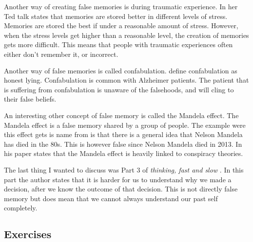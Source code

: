 \documentclass[]{article}
\begin{document}
Another way of creating false memories is during traumatic experience. In her 
Ted talk \citeauthor{Ted:1} states that memories are stored better in different
levels of stress. Memories are stored the best if under a reasonable amount of stress.
However, when the stress levels get higher than a reasonable level, the creation
of memories gets more difficult. This means that people with traumatic experiences
often either don't remember it, or incorrect.

Another way of false memories is called confabulation. \citeauthor{confabulation}
define confabulation as honest lying. Confabulation is common with Alzheimer 
patients. The patient that is suffering from confabulation is unaware of the 
falsehoods, and will cling to their false beliefs. 

An interesting other concept of false memory is called the Mandela effect. 
The Mandela effect is a false memory shared by a group of people. The 
example were this effect gets is name from is that there is a general idea 
that Nelson Mandela has died in the 80s. This is however false since Nelson Mandela
died in 2013. In his paper \citeauthor{french2019mandela} states that the Mandela
effect is heavily linked to conspiracy theories.

The last thing I wanted to discuss was Part 3 of \textit{thinking, fast and slow}
\cite{kahneman2011thinking}. In this part the author states that it is harder for 
us to understand why we made a decision, after we know the outcome of that 
decision. This is not directly false memory but does mean that we cannot always 
understand our past self completely. 


\subsection*{Exercises} 
\end{document}
